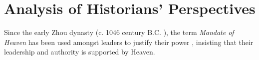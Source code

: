 \documentclass{article}
\begin{document}
\section{Analysis of Historians' Perspectives}

Since the early Zhou dynasty (c. 1046 century B.C.
\autocite{Loewe:1999}), the term \textit{Mandate of Heaven} has been used amongst leaders to justify their power
\autocite{Zhao:2009}, insisting that their leadership and authority is supported by Heaven.

\pagebreak
\printbibliography[title={Cited Works}, heading=bibintoc]
\end{document}
